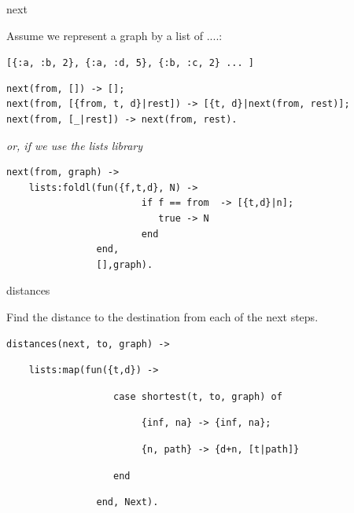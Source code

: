 \begin{frame}[fragile]{next}

  Assume we represent a graph by a list of ....:

  \vspace{10pt}\hspace{40pt}\texttt{[\{:a, :b, 2\}, \{:a, :d, 5\}, \{:b, :c, 2\} ... ]}  
  
\begin{verbatim}
next(from, []) -> [];
next(from, [{from, t, d}|rest]) -> [{t, d}|next(from, rest)];
next(from, [_|rest]) -> next(from, rest).
\end{verbatim}

\pause\vspace{10pt} 
{\em or, if we use the lists library}

\begin{verbatim}
next(from, graph) ->
    lists:foldl(fun({f,t,d}, N) -> 
                        if f == from  -> [{t,d}|n];
                           true -> N
                        end
                end,
                [],graph).
\end{verbatim}
\end{frame}

\begin{frame}[fragile]{distances}

  Find the distance to the destination from each of the next steps.

\vspace{20pt} \pause
  
\begin{verbatim}
distances(next, to, graph) ->
\end{verbatim}
\pause
\begin{verbatim}
    lists:map(fun({t,d}) ->   
\end{verbatim}
\pause
\begin{verbatim}
                   case shortest(t, to, graph) of 
\end{verbatim}
\pause
\begin{verbatim}
                        {inf, na} -> {inf, na};
\end{verbatim}
\pause
\begin{verbatim}
                        {n, path} -> {d+n, [t|path]}
\end{verbatim}
\pause
\begin{verbatim}
                   end
\end{verbatim}
\begin{verbatim}
                end, Next).    
\end{verbatim}
\end{frame}

